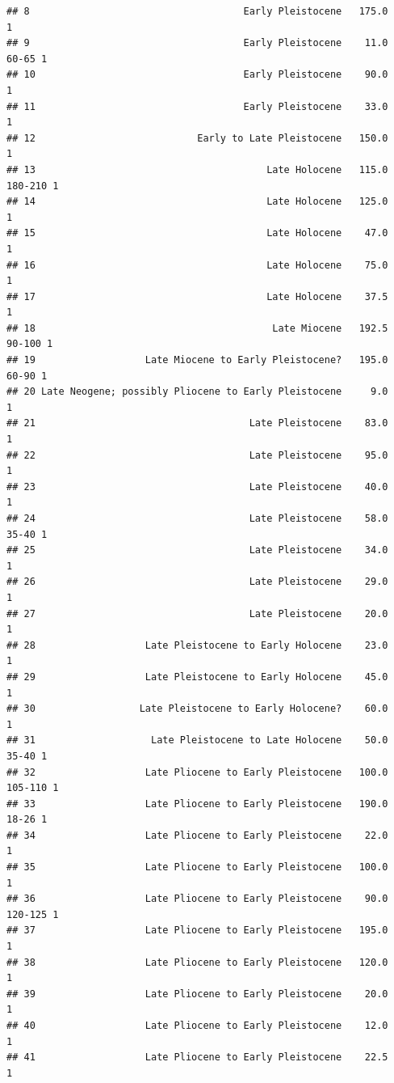 \documentclass[]{article}
\begin{document}
\begin{verbatim}
## 8                                     Early Pleistocene   175.0          1
## 9                                     Early Pleistocene    11.0    60-65 1
## 10                                    Early Pleistocene    90.0          1
## 11                                    Early Pleistocene    33.0          1
## 12                            Early to Late Pleistocene   150.0          1
## 13                                        Late Holocene   115.0  180-210 1
## 14                                        Late Holocene   125.0          1
## 15                                        Late Holocene    47.0          1
## 16                                        Late Holocene    75.0          1
## 17                                        Late Holocene    37.5          1
## 18                                         Late Miocene   192.5   90-100 1
## 19                   Late Miocene to Early Pleistocene?   195.0    60-90 1
## 20 Late Neogene; possibly Pliocene to Early Pleistocene     9.0          1
## 21                                     Late Pleistocene    83.0          1
## 22                                     Late Pleistocene    95.0          1
## 23                                     Late Pleistocene    40.0          1
## 24                                     Late Pleistocene    58.0    35-40 1
## 25                                     Late Pleistocene    34.0          1
## 26                                     Late Pleistocene    29.0          1
## 27                                     Late Pleistocene    20.0          1
## 28                   Late Pleistocene to Early Holocene    23.0          1
## 29                   Late Pleistocene to Early Holocene    45.0          1
## 30                  Late Pleistocene to Early Holocene?    60.0          1
## 31                    Late Pleistocene to Late Holocene    50.0    35-40 1
## 32                   Late Pliocene to Early Pleistocene   100.0  105-110 1
## 33                   Late Pliocene to Early Pleistocene   190.0    18-26 1
## 34                   Late Pliocene to Early Pleistocene    22.0          1
## 35                   Late Pliocene to Early Pleistocene   100.0          1
## 36                   Late Pliocene to Early Pleistocene    90.0  120-125 1
## 37                   Late Pliocene to Early Pleistocene   195.0          1
## 38                   Late Pliocene to Early Pleistocene   120.0          1
## 39                   Late Pliocene to Early Pleistocene    20.0          1
## 40                   Late Pliocene to Early Pleistocene    12.0          1
## 41                   Late Pliocene to Early Pleistocene    22.5          1

\end{verbatim}
\end{document}
